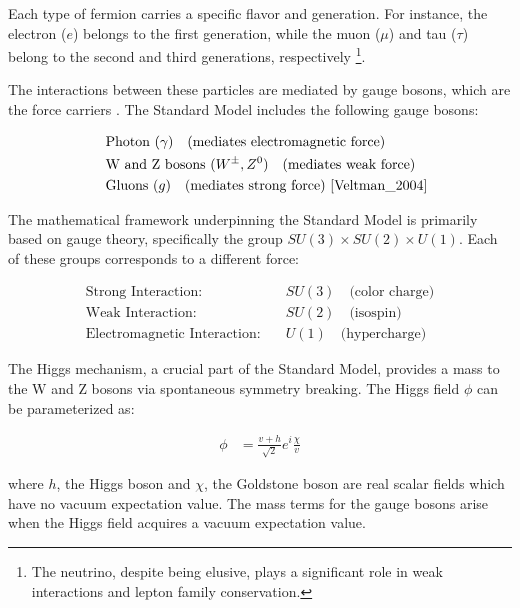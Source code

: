 Each type of fermion carries a specific flavor and generation.
For instance, the electron ($e$) belongs to the first generation, while the muon ($\mu$) and tau ($\tau$) belong to the second and third generations, respectively \cite{Nave_lepton} \footnote{The neutrino, despite being elusive, plays a significant role in weak interactions and lepton family conservation.}.

The interactions between these particles are mediated by gauge bosons, which are the force carriers \cite{Gribbin_2000}\cite{Clark_2004}.
The Standard Model includes the following gauge bosons:

\begin{align}
 & \quad \text{Photon } (\gamma) \quad \text{(mediates electromagnetic force)} \\
                    & \quad \text{W and Z bosons } (W^\pm, Z^0) \quad \text{(mediates weak force)} \\
                    & \quad \text{Gluons } (g) \quad \text{(mediates strong force) \cite{Veltman_2004}}
\end{align}

The mathematical framework underpinning the Standard Model is primarily based on gauge theory, specifically the group $SU(3) \times SU(2) \times U(1)$.
Each of these groups corresponds to a different force:

\begin{align}
\text{Strong Interaction:} & \quad SU(3) \quad \text{(color charge)} \\
\text{Weak Interaction:} & \quad SU(2) \quad \text{(isospin)} \\
\text{Electromagnetic Interaction:} & \quad U(1) \quad \text{(hypercharge)}
\end{align}

The Higgs mechanism, a crucial part of the Standard Model, provides a mass to the W and Z bosons via spontaneous symmetry breaking.
The Higgs field $\phi$ can be parameterized as:

\begin{align}
\phi &= \frac{v+h}{\sqrt{2}}e^i{\frac{\chi}{v}}
\end{align}

where $h$, the Higgs boson and $\chi$, the Goldstone boson are real scalar fields which have no vacuum expectation value.
The mass terms for the gauge bosons arise when the Higgs field acquires a vacuum expectation value\cite{Bernardi_2008}.

